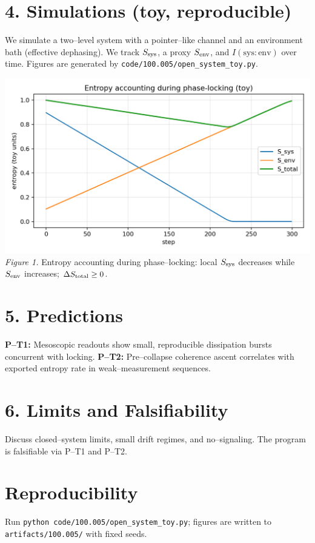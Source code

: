 \documentclass[10pt]{article}
\begin{document}
\section*{4. Simulations (toy, reproducible)}
We simulate a two--level system with a pointer--like channel and an environment bath (effective dephasing). We track $S_{\rm sys}$, a proxy $S_{\rm env}$, and $I(\mathrm{sys:env})$ over time. Figures are generated by \verb|code/100.005/open_system_toy.py|.

\begin{center}
\includegraphics[width=0.75\linewidth]{entropy_accounting.png}\\
\emph{Figure 1.} Entropy accounting during phase--locking: local $S_{\rm sys}$ decreases while $S_{\rm env}$ increases; $\Delta S_{\rm total}\ge 0$.
\end{center}

\section*{5. Predictions}
\textbf{P--T1:} Mesoscopic readouts show small, reproducible dissipation bursts concurrent with locking.\newline
\textbf{P--T2:} Pre--collapse coherence ascent correlates with exported entropy rate in weak--measurement sequences.

\section*{6. Limits and Falsifiability}
Discuss closed--system limits, small drift regimes, and no--signaling. The program is falsifiable via P--T1 and P--T2.

\section*{Reproducibility}
Run \verb|python code/100.005/open_system_toy.py|; figures are written to \verb|artifacts/100.005/| with fixed seeds.
\end{document}
